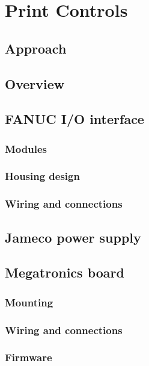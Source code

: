 \section{Print Controls}

\subsection{Approach}
\subsection{Overview}
\subsection{FANUC I/O interface}
    \subsubsection{Modules}
    \subsubsection{Housing design}
    \subsubsection{Wiring and connections}
\subsection{Jameco power supply}
\subsection{Megatronics board}
    \subsubsection{Mounting}
    \subsubsection{Wiring and connections}
    \subsubsection{Firmware}
